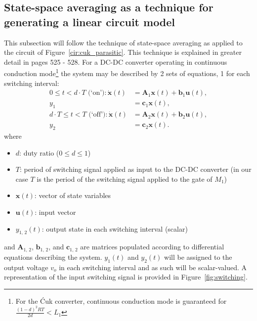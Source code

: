 \subsection{State-space averaging as a technique for generating a linear circuit model}\label{sec:ss_averaging}
This subsection will follow the technique of state-space averaging as applied to the circuit of Figure~\ref{cir:cuk_parasitic}. This technique is explained in greater detail in \cite{cuk} pages 525 - 528.
\newpar
For a DC-DC converter operating in continuous conduction mode\footnote{
For the \'{C}uk converter, continuous conduction mode is guaranteed for $\frac{(1 - d)^2 R T}{2 d} < L_1$
} the system may be described by 2 sets of equations, 1 for each switching interval:
\begin{align}
0 \leq t < d \cdot T \text{ (`on')}:
\dot{\boldsymbol{x}}(t) &= \boldsymbol{A}_1 \boldsymbol{x}(t) + \boldsymbol{b}_1 \boldsymbol{u}(t),
\nonumber
\\[11pt]
y_1&= \boldsymbol{c}_1 \boldsymbol{x}(t),\label{eqn:equations_on}
\\[11pt]
d \cdot T \leq t < T \text{ (`off')}:
\dot{\boldsymbol{x}}(t) &= \boldsymbol{A}_2 \boldsymbol{x}(t) + \boldsymbol{b}_2 \boldsymbol{u}(t),
\nonumber
\\[11pt]
y_2&= \boldsymbol{c}_2 \boldsymbol{x}(t).\label{eqn:equations_off}
\end{align}
where
\begin{itemize}
\item $d$: duty ratio ($0 \leq d \leq 1$)
\item $T$: period of switching signal applied as input to the DC-DC converter (in our case $T$ is the period of the switching signal applied to the gate of $M_1$)
\item $\boldsymbol{x}(t)$: vector of state variables
\item $\boldsymbol{u}(t)$: input vector
\item $y_{1, \, 2}(t)$: output state in each switching interval (scalar)
\end{itemize}
and $\boldsymbol{A}_{1, \, 2}$, $\boldsymbol{b}_{1, \, 2}$, and $\boldsymbol{c}_{1, \, 2}$ are matrices populated according to differential equations describing the system. $y_{1}(t)$ and $y_{2}(t)$ will be assigned to the output voltage $v_o$ in each switching interval and as such will be scalar-valued.
\newpar
A representation of the input switching signal is provided in Figure~\ref{fig:switching}.
